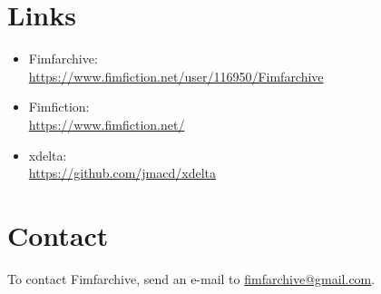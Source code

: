\documentclass[hidelinks,a4paper,12pt]{article}
\begin{document}
\section{Links} \label{sec:links}

\begin{itemize}
\item Fimfarchive: \\ \url{https://www.fimfiction.net/user/116950/Fimfarchive}
\item Fimfiction: \\ \url{https://www.fimfiction.net/}
\item xdelta: \\ \url{https://github.com/jmacd/xdelta}
\end{itemize}


\section{Contact} \label{sec:contact}

To contact Fimfarchive, send an e-mail to \href{mailto:fimfarchive@gmail.com}{fimfarchive@gmail.com}.
\end{document}
